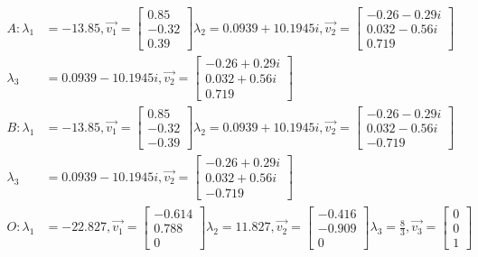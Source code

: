 \documentclass[12pt, a4paper]{article}
\theoremstyle{definition}
\begin{document}
\begin{align*}
    A: \lambda_1 &= -13.85, \Vec{v_1} = \left[ \begin{array}{cc}0.85 \\ -0.32 \\ 0.39\end{array} \right] \lambda_2 = 0.0939 + 10.1945i, \Vec{v_2} = \left[ \begin{array}{c} -0.26-0.29i \\ 0.032-0.56i \\ 0.719 \end{array} \right]\\
    \lambda_3 &= 0.0939 - 10.1945i, \Vec{v_2} = \left[ \begin{array}{c} -0.26+0.29i \\ 0.032+0.56i \\ 0.719 \end{array} \right]\\
    B: \lambda_1 &= -13.85, \Vec{v_1} = \left[ \begin{array}{cc}0.85 \\ -0.32 \\ -0.39\end{array} \right] \lambda_2 = 0.0939 + 10.1945i, \Vec{v_2} = \left[ \begin{array}{c} -0.26-0.29i \\ 0.032-0.56i \\ -0.719 \end{array} \right]\\
    \lambda_3 &= 0.0939 - 10.1945i, \Vec{v_2} = \left[ \begin{array}{c} -0.26+0.29i \\ 0.032+0.56i \\ -0.719 \end{array} \right]\\
    O: \lambda_1 &= -22.827, \Vec{v_1} = \left[\begin{array}{c} -0.614\\  0.788\\ 0\end{array} \right] \lambda_2 = 11.827, \Vec{v_2} = \left[ \begin{array}{c} -0.416\\-0.909\\0\end{array}\right]
    \lambda_3 = \frac{8}{3}, \Vec{v_3} = \left[ \begin{array}{c}0\\0\\1\end{array} \right]
\end{align*}
\end{document}
